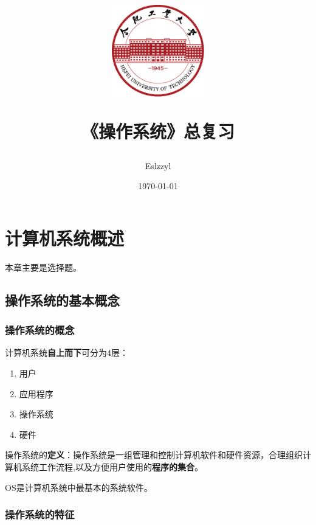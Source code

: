 \documentclass[12pt, a4paper, oneside]{ctexart}
\title{
    \includegraphics[width=0.3\textwidth]{images/hfut-badge.pdf}
    
    \vspace{20pt}
    《操作系统》总复习
}
\author{Eslzzyl}
\date{\today}
\begin{document}
\maketitle
\newpage
\tableofcontents
\vspace{20pt}

\newpage

\section{计算机系统概述}

本章主要是选择题。

\subsection{操作系统的基本概念}

\subsubsection{操作系统的概念}

计算机系统\textbf{自上而下}可分为4层：
\begin{enumerate}
  \item 用户
  \item 应用程序
  \item 操作系统
  \item 硬件
\end{enumerate}

操作系统的\textbf{定义}：操作系统是一组管理和控制计算机软件和硬件资源，合理组织计算机系统工作流程,以及方便用户使用的\textbf{程序的集合}。

OS是计算机系统中最基本的系统软件。

\subsubsection{操作系统的特征}
\end{document}
